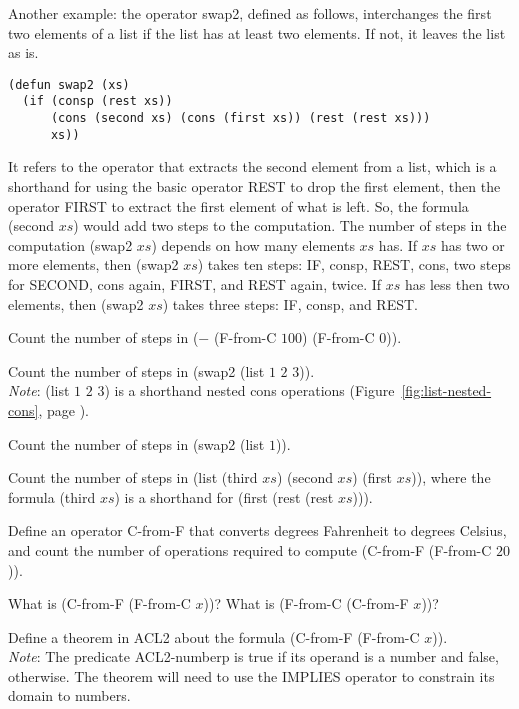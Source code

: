 Another example:
the operator swap2, defined as follows, interchanges the
first two elements of a list if the list has at least two elements.
If not, it leaves the list as is.

\begin{Verbatim}
(defun swap2 (xs)
  (if (consp (rest xs))
      (cons (second xs) (cons (first xs)) (rest (rest xs)))
      xs))
\end{Verbatim}

It refers to the operator that extracts the second element from a list,
which is a shorthand for using the basic operator REST to drop the
first element, then the operator FIRST to extract the first element
of what is left.
\label{steps-in-second-op}
So, the formula (second $xs$) would add two steps
to the computation. The number of steps in the computation (swap2 $xs$)
depends on how many elements $xs$ has. If $xs$ has two or more elements,
then (swap2 $xs$) takes ten steps: IF, consp, REST, cons, two steps for SECOND,
cons again, FIRST, and REST again, twice.
If $xs$ has less then two elements, then (swap2 $xs$) takes three steps:
IF, consp, and REST.

\begin{ExerciseList}

\Exercise
Count the number of steps in ($-$ (F-from-C $100$) (F-from-C $0$)).

\Exercise\label{ex:swap2-count}
Count the number of steps in (swap2 (list $1$ $2$ $3$)).\\
\emph{Note}: (list $1$ $2$ $3$) is a shorthand nested cons operations
(Figure~\ref{fig:list-nested-cons}, page \pageref{fig:list-nested-cons}).

\Exercise
Count the number of steps in (swap2 (list $1$)).

\Exercise
Count the number of steps in
(list (third $xs$) (second $xs$) (first $xs$)),
where the formula (third $xs$) is a shorthand for
(first (rest (rest $xs$))).

\Exercise
Define an operator C-from-F that converts degrees Fahrenheit
to degrees Celsius, and count the number of operations
required to compute (C-from-F (F-from-C $20$)).

\Exercise
What is (C-from-F (F-from-C $x$))?
What is (F-from-C (C-from-F $x$))?

\Exercise
Define a theorem in ACL2 about the formula (C-from-F (F-from-C $x$)). \\
\emph{Note}: The predicate ACL2-numberp is true if its operand is a number
and false, otherwise.
The theorem will need to use the IMPLIES operator to constrain its domain
to numbers.

\end{ExerciseList}

